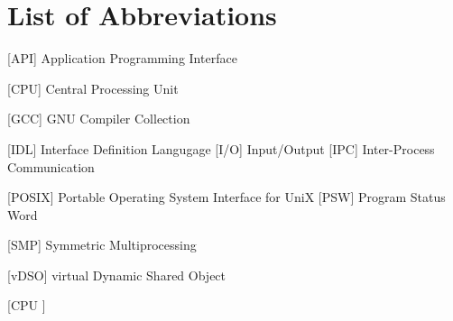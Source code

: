 
\chapter*{List of Abbreviations}

\begin{acronym} [CPU ]
 [API] {Application Programming Interface}


 [CPU] {Central Processing Unit}




 [GCC] {GNU Compiler Collection}


 [IDL] {Interface Definition Langugage}
 [I/O] {Input/Output}
[IPC] {Inter-Process Communication}







 [POSIX] {Portable Operating System Interface for UniX}
 [PSW] {Program Status Word}



 [SMP] {Symmetric Multiprocessing}



 [vDSO] {virtual Dynamic Shared Object}





\end{acronym} [CPU ]
